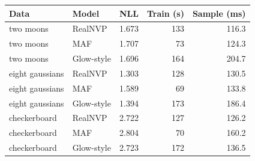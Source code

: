 \begin{tabular}{llrrr}
\hline
Data & Model & NLL & Train (s) & Sample (ms) \\
\hline
two moons & RealNVP & 1.673 & 133 & 116.3 \\
two moons & MAF & 1.707 & 73 & 124.3 \\
two moons & Glow-style & 1.696 & 164 & 204.7 \\
eight gaussians & RealNVP & 1.303 & 128 & 130.5 \\
eight gaussians & MAF & 1.589 & 69 & 133.8 \\
eight gaussians & Glow-style & 1.394 & 173 & 186.4 \\
checkerboard & RealNVP & 2.722 & 127 & 126.2 \\
checkerboard & MAF & 2.804 & 70 & 160.2 \\
checkerboard & Glow-style & 2.723 & 172 & 136.5 \\
\hline
\end{tabular}
